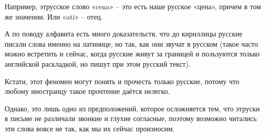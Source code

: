 
\begin{zznagolos}
Например, этрусское слово «cena» – это есть наше русское «цена», причем в том же значении. Или «ati» – отец.	
\end{zznagolos}

А по поводу алфавита есть много доказательств, что до кириллицы русские писали
слова именно на латинице, но так, как они звучат в русском (такое часто можно
встретить и сейчас, когда русские живут за границей и пользуются только
английской раскладкой, но пишут при этом русский текст). 

\begin{zznagolos}
Кстати, этот феномен могут понять и прочесть только русские, потому что любому
иностранцу такое прочтение даётся нелегко.	
\end{zznagolos}

Однако, это лишь одно из предположений, которое осложняется тем, что этруски в
письме не различали звонкие и глухие согласные, поэтому возможно читались эти
слова вовсе не так, как мы их сейчас произносим.


